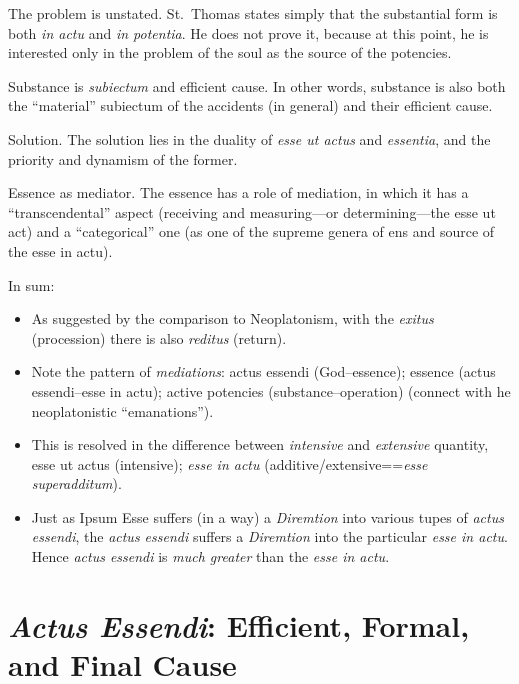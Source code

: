 \begin{DONE}
The problem is unstated.
St.~Thomas states simply that the substantial form is both \emph{in actu} and \emph{in potentia}. He does not prove it, because at this point, he is interested only in the problem of the soul as the source of the potencies.

Substance is \emph{subiectum} and efficient cause.
In other words, substance is also both the “material” subiectum of the accidents (in general) and their efficient cause.

Solution. The solution lies in the duality of \emph{esse ut actus} and \emph{essentia}, and the priority and dynamism of the former.

Essence as mediator.
The essence has a role of mediation, in which it has a “transcendental” aspect (receiving and measuring—or determining—the esse ut act) and a “categorical” one (as one of the supreme genera of ens and source of the esse in actu).


\end{DONE}

\begin{DONE}

In sum:

\begin{itemize}

  \item As suggested by the comparison to Neoplatonism, with the \emph{exitus} (procession) there is also \emph{reditus} (return).

  \item Note the pattern of \emph{mediations}: actus essendi (God–essence); essence (actus essendi–esse in actu); active potencies (substance–operation) (connect with he neoplatonistic “emanations”).

  \item This is resolved in the difference between \emph{intensive} and \emph{extensive} quantity, esse ut actus (intensive); \emph{esse in actu} (additive/extensive==\emph{esse superadditum}).

  \item Just as Ipsum Esse suffers (in a way) a \emph{Diremtion} into various tupes of \emph{actus essendi}, the \emph{actus essendi} suffers a \emph{Diremtion} into the particular \emph{esse in actu}. Hence \emph{actus essendi} is \emph{much greater} than the \emph{esse in actu}.

\end{itemize}
\end{DONE}


\section{\emph{Actus Essendi}: Efficient, Formal, and Final Cause}

